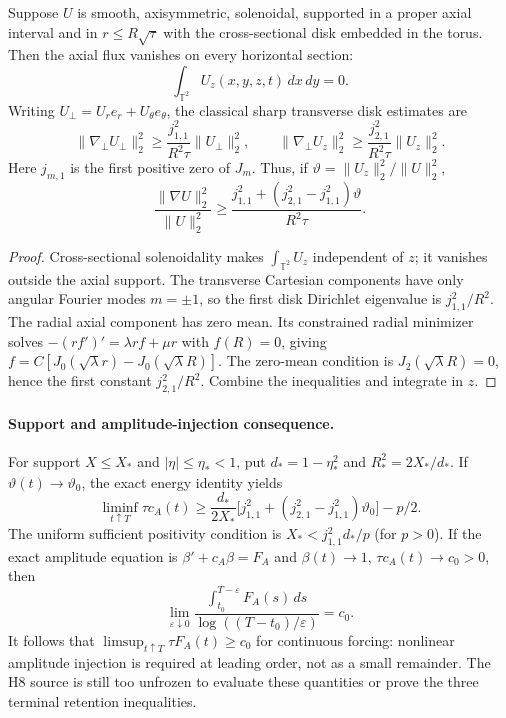 \begin{theorem}
Suppose $U$ is smooth, axisymmetric, solenoidal, supported in a proper axial interval and in $r\le R\sqrt{\tau}$ with the cross-sectional disk embedded in the torus. Then the axial flux vanishes on every horizontal section:
\[
\int_{\mathbb T^2}U_z(x,y,z,t)\,dx\,dy=0.
\]
Writing $U_\perp=U_re_r+U_\theta e_\theta$, the classical sharp transverse disk estimates are
\[
\|\nabla_\perp U_\perp\|_2^2\ge \frac{j_{1,1}^2}{R^2\tau}\|U_\perp\|_2^2,\qquad
\|\nabla_\perp U_z\|_2^2\ge \frac{j_{2,1}^2}{R^2\tau}\|U_z\|_2^2.
\]
Here $j_{m,1}$ is the first positive zero of $J_m$. Thus, if
$\vartheta=\|U_z\|_2^2/\|U\|_2^2$,
\[
\boxed{\frac{\|\nabla U\|_2^2}{\|U\|_2^2}
\ge \frac{j_{1,1}^2+(j_{2,1}^2-j_{1,1}^2)\vartheta}{R^2\tau}.}
\]
\end{theorem}
\begin{proof}
Cross-sectional solenoidality makes $\int_{\mathbb T^2}U_z$ independent of $z$; it vanishes outside the axial support. The transverse Cartesian components have only angular Fourier modes $m=\pm1$, so the first disk Dirichlet eigenvalue is $j_{1,1}^2/R^2$. The radial axial component has zero mean. Its constrained radial minimizer solves
$-(rf')'=\lambda rf+\mu r$ with $f(R)=0$, giving
$f=C[J_0(\sqrt\lambda r)-J_0(\sqrt\lambda R)]$.
The zero-mean condition is $J_2(\sqrt\lambda R)=0$, hence the first constant $j_{2,1}^2/R^2$. Combine the inequalities and integrate in $z$.
\end{proof}
\paragraph{Support and amplitude-injection consequence.}
For support $X\le X_*$ and $|\eta|\le\eta_*<1$, put
$d_*=1-\eta_*^2$ and $R_*^2=2X_*/d_*$. If $\vartheta(t)\to\vartheta_0$, the exact energy identity yields
\[
\boxed{\liminf_{t\uparrow T}\tau c_A(t)\ge
\frac{d_*}{2X_*}\big[j_{1,1}^2+(j_{2,1}^2-j_{1,1}^2)\vartheta_0\big]-p/2.}
\]
The uniform sufficient positivity condition is
$X_*<j_{1,1}^2d_*/p$ (for $p>0$).
If the exact amplitude equation is $\beta'+c_A\beta=F_A$ and
$\beta(t)\to1$, $\tau c_A(t)\to c_0>0$, then
\[
\boxed{\lim_{\varepsilon\downarrow0}
\frac{\int_{t_0}^{T-\varepsilon}F_A(s)\,ds}
{\log((T-t_0)/\varepsilon)}=c_0.}
\]
It follows that $\limsup_{t\uparrow T}\tau F_A(t)\ge c_0$ for continuous forcing: nonlinear amplitude injection is required at leading order, not as a small remainder. The H8 source is still too unfrozen to evaluate these quantities or prove the three terminal retention inequalities.
